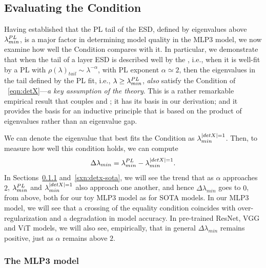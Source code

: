 
\subsection{Evaluating the \TRACELOG  Condition}
\label{sxn:empirical-trace_log}

Having established that the PL tail of the ESD, defined by eigenvalues above $\lambda^{PL}_{min}$, is a major factor in determining model quality in the MLP3 model, we now examine how well the \TRACELOG  Condition compares with it. 
In particular, we demonstrate that when the tail of a layer ESD is described well by the \HTSR \Phenomenology, i.e., when 
it is well-fit by a PL with $\rho(\lambda)_{tail}\sim\lambda^{-\alpha}$, with PL exponent $\alpha\simeq2$, then the 
eigenvalues in the tail defined by the PL fit, i.e., $\lambda\ge\lambda^{PL}_{min}$, \emph{also} satisfy the \TRACELOG  Condition 
of \EQN~\ref{eqn:detX}---\emph{a key assumption of the \SETOL theory}.
This is a rather remarkable empirical result that couples \HTSR and \SETOL; it has its basis in our \SETOL derivation; and it provides the basis for an inductive principle that is based on the product of eigenvalues rather than an eigenvalue gap.

We can denote the eigenvalue that best fits the \TRACELOG  Condition as $\lambda^{\vert detX\vert=1}_{min}$. 
Then, to measure how well this condition holds, we can compute
\begin{align}
        \label{eqn:D_lambda_min}
        \Delta \lambda_{min} = \lambda^{PL}_{min} - \lambda^{\vert detX\vert=1}_{min}  .
\end{align}
In Sections~\ref{sxn:detx-mlp3} and~\ref{sxn:detx-sota}, we will see the trend that as $\alpha$ approaches $2$, $\lambda^{PL}_{min}$ and $\lambda^{\vert detX\vert=1}_{min}$ also approach one another, and hence $\Delta \lambda_{min}$ goes to $0$, from above, both for our toy MLP3 model as for SOTA models.
In our MLP3 model, we will see that a crossing of the equality condition coincides with over-regularization and a degradation in model accuracy. 
In pre-trained ResNet\cite{ResNet15_TR}, VGG\cite{VGG14_TR} and ViT\cite{VIT20_TR} models, we will also see, empirically, that in general $\Delta \lambda_{min}$ remains positive, just as $\alpha$ remains above $2$.


\subsubsection{The MLP3 model}
\label{sxn:detx-mlp3}

